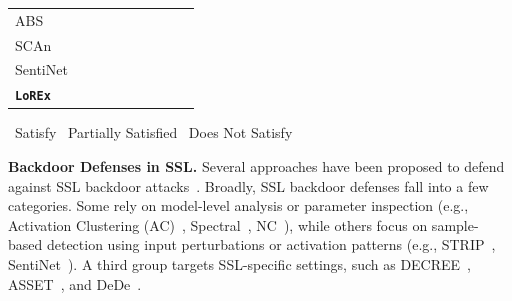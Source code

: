 \documentclass[letterpaper,twocolumn,10pt]{article}
\newcommand{\nosatisfy}{\Circle} %
\newcommand{\partsatisfy}{\LEFTcircle} %
\newcommand{\fullsatisfy}{{\CIRCLE}} %
\begin{document}
\begin{table}[h]
{\begin{tabular}{@{}l cccccccc@{}}
ABS~\cite{liu2019abs} & \fullsatisfy & \fullsatisfy & \nosatisfy & \nosatisfy & \fullsatisfy & \nosatisfy & \nosatisfy \\
SCAn~\cite{tang2021demon} & \fullsatisfy & \fullsatisfy & \nosatisfy & \nosatisfy & \fullsatisfy & \partsatisfy & \nosatisfy \\
SentiNet~\cite{chou2020sentinet} & \partsatisfy & \fullsatisfy & \partsatisfy & \nosatisfy & \partsatisfy & \fullsatisfy & \nosatisfy \\
\textbf{\texttt{LoREx}} & \fullsatisfy & \fullsatisfy & \fullsatisfy & \fullsatisfy & \fullsatisfy & \fullsatisfy & \fullsatisfy \\
\bottomrule
\end{tabular}
}

\vspace{4pt}
\centering
\small
\fullsatisfy\ Satisfy \quad
\partsatisfy\ Partially Satisfied \quad
\nosatisfy\ Does Not Satisfy

\end{table}



\par \textbf{Backdoor Defenses in SSL.}
Several approaches have been proposed to defend against SSL backdoor attacks~\cite{ma2022beatrix,
chen2018detecting,
feng2023detecting,
gao2019strip,
tran2018spectral,
wang2019neural,
asset,
hou2025dede,
popovic2024debackdoor,
liu2019abs,
tang2021demon,
chou2020sentinet
}. Broadly, SSL backdoor defenses fall into a few categories. Some rely on model-level analysis or parameter inspection (e.g., Activation Clustering (AC)~\cite{chen2018detecting}, Spectral~\cite{tran2018spectral}, NC~\cite{wang2019neural}), while others focus on sample-based detection using input perturbations or activation patterns (e.g., STRIP~\cite{gao2019strip}, SentiNet~\cite{chou2020sentinet}). A third group targets SSL-specific settings, such as DECREE~\cite{feng2023detecting}, ASSET~\cite{asset}, and DeDe~\cite{hou2025dede}.
\end{document}
